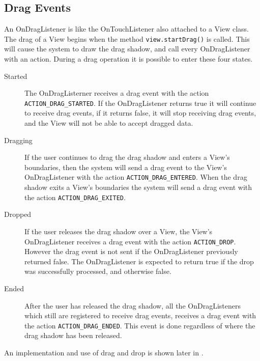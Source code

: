 \subsection*{Drag Events}
An OnDragListener is like the OnTouchListener also attached to a View class. The drag of a View begins when the method \lstinline|view.startDrag()| is called. This will cause the system to draw the drag shadow, and call every OnDragListener with an action. During a drag operation it is possible to enter these four states.
\begin{description}
\item[Started] The OnDragListerner receives a drag event with the action \linebreak \lstinline|ACTION_DRAG_STARTED|. If the OnDragListener returns true it will continue to receive drag events, if it returns false, it will stop receiving drag events, and the View will not be able to accept dragged data.

\item[Dragging] If the user continues to drag the drag shadow and enters a View's boundaries, then the system will send a drag event to the View's OnDragListener with the action \lstinline|ACTION_DRAG_ENTERED|. When the drag shadow exits a View's boundaries the system will send a drag event with the action \linebreak \lstinline|ACTION_DRAG_EXITED|.

\item[Dropped] If the user releases the drag shadow over a View, the View's OnDragListener receives a drag event with the action \lstinline|ACTION_DROP|. However the drag event is not sent if the OnDragListener previously returned false. The OnDragListener is expected to return true if the drop was successfully processed, and otherwise false.

\item[Ended] After the user has released the drag shadow, all the OnDragListeners which still are registered to receive drag events, receives a drag event with the action \lstinline|ACTION_DRAG_ENDED|. This event is done regardless of where the drag shadow has been released.
\end{description}
An implementation and use of drag and drop is shown later in .

